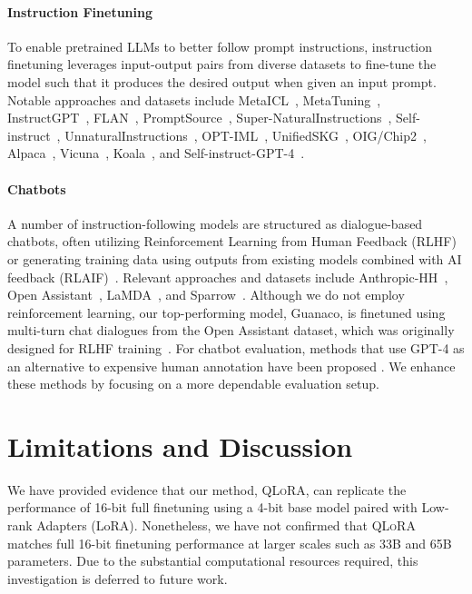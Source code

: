 \paragraph{Instruction Finetuning} To enable pretrained LLMs to better follow prompt instructions, instruction finetuning leverages input-output pairs from diverse datasets to fine-tune the model such that it produces the desired output when given an input prompt. Notable approaches and datasets include MetaICL~\citep{min2021metaicl}, MetaTuning~\citep{zhong2021adapting}, InstructGPT~\citep{ouyang2022training}, FLAN~\citep{wei2021finetuned,chung2022scaling}, PromptSource~\citep{bach2022promptsource}, Super-NaturalInstructions~\citep{wang2022super,sanh2021multitask}, Self-instruct~\citep{wang2022self}, UnnaturalInstructions~\citep{honovich2022unnatural}, OPT-IML~\citep{iyer2022opt}, UnifiedSKG~\citep{xie2022unifiedskg}, OIG/Chip2~\citep{laion2023}, Alpaca~\citep{alpaca}, Vicuna~\citep{vicuna2023}, Koala~\citep{koala_blogpost_2023}, and Self-instruct-GPT-4~\citep{peng2023instruction}.

\paragraph{Chatbots} A number of instruction-following models are structured as dialogue-based chatbots, often utilizing Reinforcement Learning from Human Feedback (RLHF)~\citep{christiano2017deep} or generating training data using outputs from existing models combined with AI feedback (RLAIF)~\citep{bai2022constitutional}. Relevant approaches and datasets include Anthropic-HH~\citep{askell2021general,bai2022training}, Open Assistant~\citep{kopf2023openassistant}, LaMDA~\citep{thoppilan2022lamda}, and Sparrow~\citep{glaese2022improving}. Although we do not employ reinforcement learning, our top-performing model, Guanaco, is finetuned using multi-turn chat dialogues from the Open Assistant dataset, which was originally designed for RLHF training~\citep{kopf2023openassistant}. For chatbot evaluation, methods that use GPT-4 as an alternative to expensive human annotation have been proposed \citep{vicuna2023,peng2023instruction}. We enhance these methods by focusing on a more dependable evaluation setup.

\section{Limitations and Discussion}

We have provided evidence that our method, \textsc{QLoRA}, can replicate the performance of 16-bit full finetuning using a 4-bit base model paired with Low-rank Adapters (LoRA). Nonetheless, we have not confirmed that \textsc{QLoRA} matches full 16-bit finetuning performance at larger scales such as 33B and 65B parameters. Due to the substantial computational resources required, this investigation is deferred to future work.

